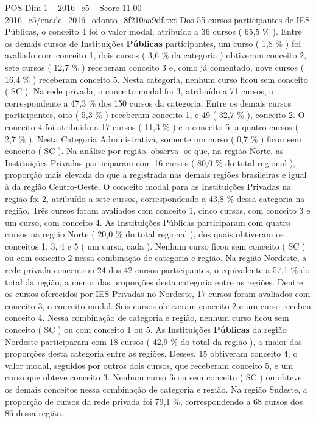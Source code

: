 \begin{textsample}{POS Dim 1 – 2016\_c5 – Score 11.00 – 2016\_c5/enade\_2016\_odonto\_8f210aa9df.txt}
Dos 55 cursos participantes de IES Públicas, o conceito 4 foi o valor modal, atribuído a 36 cursos ( 65,5 \% ).
Entre os demais cursos de Instituições \textbf{Públicas} participantes, um curso ( 1,8 \% ) foi avaliado com conceito 1, dois cursos ( 3,6 \% da categoria ) obtiveram conceito 2, sete cursos ( 12,7 \% ) receberam conceito 3 e, como já comentado, nove cursos ( 16,4 \% ) receberam conceito 5.
Nesta categoria, nenhum curso ficou sem conceito ( SC ).
Na rede privada, o conceito modal foi 3, atribuído a 71 cursos, o correspondente a 47,3 \% dos 150 cursos da categoria.
Entre os demais cursos participantes, oito ( 5,3 \% ) receberam conceito 1, e 49 ( 32,7 \% ), conceito 2.
O conceito 4 foi atribuído a 17 cursos ( 11,3 \% ) e o conceito 5, a quatro cursos ( 2,7 \% ).
Nesta Categoria Administrativa, somente um curso ( 0,7 \% ) ficou sem conceito ( SC ).
Na análise por região, observa -se que, na região Norte, as Instituições Privadas participaram com 16 cursos ( 80,0 \% do total regional ), proporção mais elevada do que a registrada nas demais regiões brasileiras e igual à da região Centro-Oeste.
O conceito modal para as Instituições Privadas na região foi 2, atribuído a sete cursos, correspondendo a 43,8 \% dessa categoria na região.
Três cursos foram avaliados com conceito 1, cinco cursos, com conceito 3 e um curso, com conceito 4.
As Instituições Públicas participaram com quatro cursos na região Norte ( 20,0 \% do total regional ), dos quais obtiveram os conceitos 1, 3, 4 e 5 ( um curso, cada ).
Nenhum curso ficou sem conceito ( SC ) ou com conceito 2 nessa combinação de categoria e região.
Na região Nordeste, a rede privada concentrou 24 dos 42 cursos participantes, o equivalente a 57,1 \% do total da região, a menor das proporções desta categoria entre as regiões.
Dentre os cursos oferecidos por IES Privadas no Nordeste, 17 cursos foram avaliados com conceito 3, o conceito modal.
Seis cursos obtiveram conceito 2 e um curso recebeu conceito 4.
Nessa combinação de categoria e região, nenhum curso ficou sem conceito ( SC ) ou com conceito 1 ou 5.
As Instituições \textbf{Públicas} da região Nordeste participaram com 18 cursos ( 42,9 \% do total da região ), a maior das proporções desta categoria entre as regiões.
Desses, 15 obtiveram conceito 4, o valor modal, seguidos por outros dois cursos, que receberam conceito 5, e um curso que obteve conceito 3.
Nenhum curso ficou sem conceito ( SC ) ou obteve os demais conceitos nessa combinação de categoria e região.
Na região Sudeste, a proporção de cursos da rede privada foi 79,1 \%, correspondendo a 68 cursos dos 86 dessa região.

\end{textsample}
